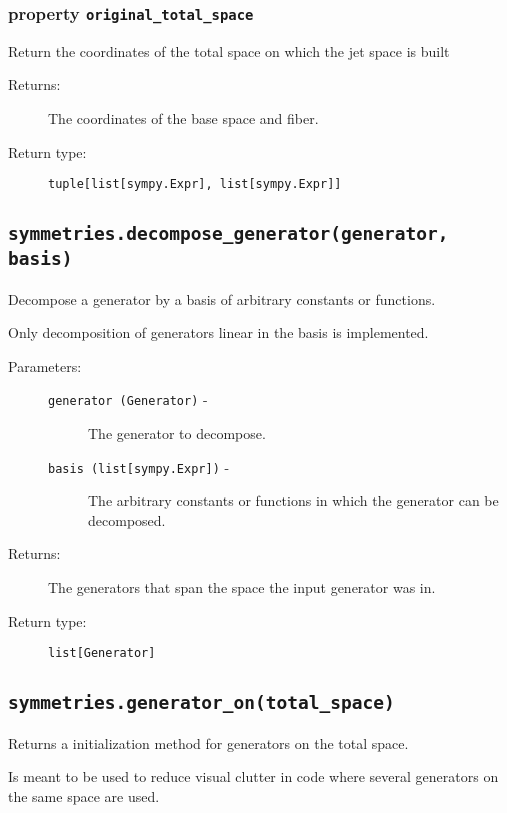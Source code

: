    \subsubsection*{property \lstinline{original_total_space}}

      Return the coordinates of the total space on which the jet
      space is built

      \begin{description}
         \item[Returns:] The coordinates of the base space and fiber.
         \item[Return type:] \lstinline{tuple[list[sympy.Expr], list[sympy.Expr]]}
      \end{description}         

\subsection*{\lstinline{symmetries.decompose_generator(generator, basis)}}

   Decompose a generator by a basis of arbitrary constants or
   functions.

   Only decomposition of generators linear in the basis is
   implemented.

   \begin{description}
      \item[Parameters:] \leavevmode
        \begin{description}
            \item[\lstinline{generator (Generator)} -] The generator to decompose.
            \item[\lstinline{basis (list[sympy.Expr])} -] The arbitrary constants or functions in which the generator can be decomposed.
        \end{description}
      \item[Returns:] The generators that span the space the input generator was in.
      \item[Return type:] \lstinline{list[Generator]}
   \end{description}

\subsection*{\lstinline{symmetries.generator_on(total_space)}}

   Returns a initialization method for generators on the total space.

   Is meant to be used to reduce visual clutter in code where several
   generators on the same space are used.

